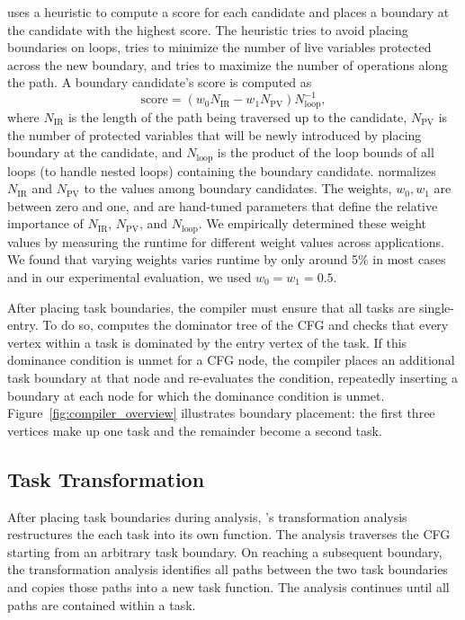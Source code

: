 \sys uses a heuristic to compute a score for each candidate and places a
boundary at the candidate with the highest score. The heuristic tries to avoid
placing boundaries on loops, tries to minimize the number of live variables 
protected across the new boundary, and tries to maximize the number of operations
along the path. A boundary candidate's score is computed as
%
\begin{equation}
\text{score} = {\left(w_{0} N_{\text{IR}} - w_{1} N_{\text{PV}}\right)}{N_{\text{loop}}^{-1}},\nonumber
\end{equation}
%
where $N_{\text{IR}}$ is the length of the path being traversed up to the
candidate, $N_{\text{PV}}$ is the number of protected variables that will be
newly introduced by placing boundary at the candidate, and $N_{\text{loop}}$ is
the product of the loop bounds of all loops (to handle nested loops) containing the
boundary candidate. \sys normalizes $N_{\text{IR}}$ and $N_{\text{PV}}$ to the
values among boundary candidates. The weights, $w_{0}, w_{1}$ are between zero
and one, and are hand-tuned parameters that define the relative importance of
$N_{\text{IR}}$,
$N_{\text{PV}}$, and $N_{\text{loop}}$. We empirically determined these weight
values by measuring the runtime for different weight values across
applications. We found that varying weights varies runtime by only around 5\%
in most cases and in our experimental evaluation, we used $w_{0} = w_{1} =
0.5$.

After placing task boundaries, the compiler must ensure that all tasks are
single-entry. To do so, \sys computes the dominator tree of the CFG and checks
that every vertex within a task is dominated by the entry vertex of the task.
If this dominance condition is unmet for a CFG node, the compiler places an
additional task boundary at that node and re-evaluates the condition, repeatedly
inserting a boundary at each node for which the dominance condition is unmet.
Figure~\ref{fig:compiler_overview} illustrates boundary placement: the first
three vertices make up one task and the remainder become a second task.

\subsection{Task Transformation}
\label{sec:compiler_transform_pass}

After placing task boundaries during analysis, \sys's transformation analysis
restructures the each task into its own function. The analysis
traverses the CFG starting from an arbitrary task boundary. On reaching a
subsequent boundary, the transformation analysis identifies all paths between
the two task boundaries and copies those paths into a new task function. The
analysis continues until all paths are contained within a task. 

